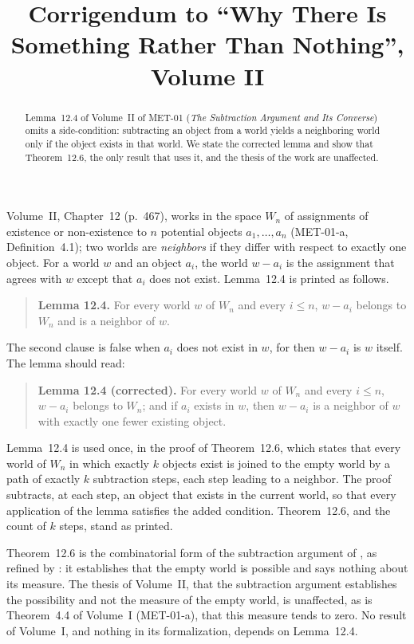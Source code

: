 \documentclass{situationist-preprint}
\title{Corrigendum to \enquote{Why There Is Something Rather Than Nothing}, Volume II}
\begin{document}
\maketitle

\begin{abstract}
Lemma~12.4 of Volume~II of MET-01 (\emph{The Subtraction Argument and Its Converse}) omits a side-condition: subtracting an object from a world yields a neighboring world only if the object exists in that world. We state the corrected lemma and show that Theorem~12.6, the only result that uses it, and the thesis of the work are unaffected.
\end{abstract}

Volume~II, Chapter~12 (p.~467), works in the space $W_n$ of assignments of existence or non-existence to $n$ potential objects $a_1, \ldots, a_n$ (MET-01-a, Definition~4.1); two worlds are \emph{neighbors} if they differ with respect to exactly one object. For a world $w$ and an object $a_i$, the world $w - a_i$ is the assignment that agrees with $w$ except that $a_i$ does not exist. Lemma~12.4 is printed as follows.

\begin{quote}\small
\textbf{Lemma 12.4.} For every world $w$ of $W_n$ and every $i \leq n$, $w - a_i$ belongs to $W_n$ and is a neighbor of $w$.
\end{quote}

The second clause is false when $a_i$ does not exist in $w$, for then $w - a_i$ is $w$ itself. The lemma should read:

\begin{quote}\small
\textbf{Lemma 12.4 (corrected).} For every world $w$ of $W_n$ and every $i \leq n$, $w - a_i$ belongs to $W_n$; and if $a_i$ exists in $w$, then $w - a_i$ is a neighbor of $w$ with exactly one fewer existing object.
\end{quote}

Lemma~12.4 is used once, in the proof of Theorem~12.6, which states that every world of $W_n$ in which exactly $k$ objects exist is joined to the empty world by a path of exactly $k$ subtraction steps, each step leading to a neighbor. The proof subtracts, at each step, an object that exists in the current world, so that every application of the lemma satisfies the added condition. Theorem~12.6, and the count of $k$ steps, stand as printed.

Theorem~12.6 is the combinatorial form of the subtraction argument of \citet{Baldwin1996}, as refined by \citet{RodriguezPereyra1997}: it establishes that the empty world is possible and says nothing about its measure. The thesis of Volume~II, that the subtraction argument establishes the possibility and not the measure of the empty world, is unaffected, as is Theorem~4.4 of Volume~I (MET-01-a), that this measure tends to zero. No result of Volume~I, and nothing in its formalization, depends on Lemma~12.4.
\end{document}
